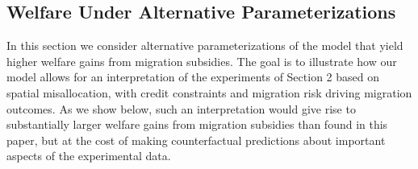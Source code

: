 \documentclass[12pt,pdftex]{article}
\renewcommand{\arraystretch}{1.1}
\begin{document}
\begin{onehalfspacing}
\newpage

\section{Welfare Under Alternative Parameterizations}

In this section we consider alternative parameterizations of the model that yield higher welfare gains from migration subsidies. The goal is to illustrate how our model allows for an interpretation of the experiments of Section 2 based on spatial misallocation, with credit constraints and migration risk driving migration outcomes. As we show below, such an interpretation would give rise to substantially larger welfare gains from migration subsidies than found in this paper, but at the cost of making counterfactual predictions about important aspects of the experimental data.

\begin{table}[h]
\small
\setlength {\tabcolsep}{3.75mm}
\renewcommand{\arraystretch}{1.5}
\centering


\end{table}
\end{onehalfspacing}
\end{document}
